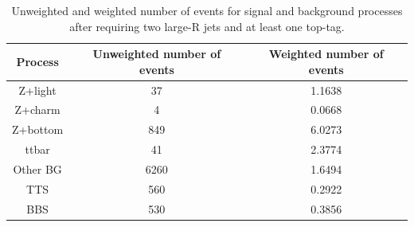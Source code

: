 \begin{table}
\centering
\begin{tabular}{|c|c|c|} 
\hline
\textbf{Process} & \textbf{Unweighted number of events} & \textbf{Weighted number of events}  \\
\hline
\hline
Z+light & 37 & 1.1638\\
Z+charm & 4 & 0.0668\\
Z+bottom & 849 & 6.0273\\
ttbar{} & 41 & 2.3774\\
Other BG & 6260 & 1.6494\\
TTS & 560 & 0.2922\\
BBS & 530 & 0.3856\\
\hline
\end{tabular}
\caption{Unweighted and weighted number of events for signal and background processes after requiring two large-R jets and at least one top-tag.}
\label{numberoevents1}
\end{table}

 


















